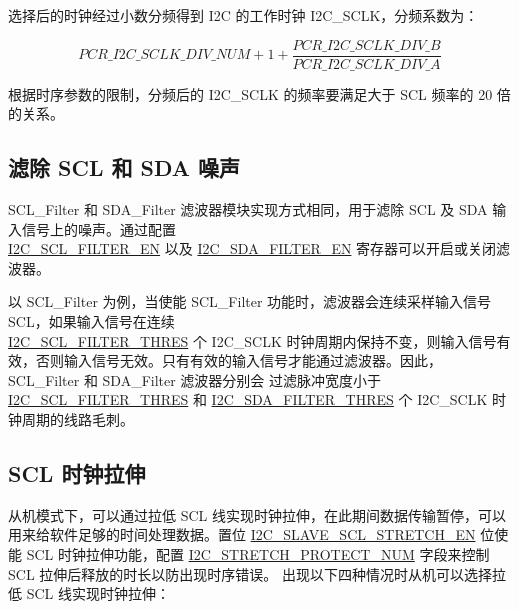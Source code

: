 \documentclass[main\_\_CN.tex]{subfiles}
\begin{document}
选择后的时钟经过小数分频得到 I2C 的工作时钟 I2C\_SCLK，分频系数为：

\[
PCR\_I2C\_SCLK\_DIV\_ NUM + 1+\frac{ \hyperref[fielddesc:PCRI2CSCLKDIVB]{PCR\_I2C\_SCLK\_DIV\_B}}{\hyperref[fielddesc:PCRI2CSCLKDIVA]{PCR\_I2C\_SCLK\_DIV\_A}}
\]

根据时序参数的限制，分频后的 I2C\_SCLK 的频率要满足大于 SCL 频率的 20 倍的关系。


\subsection{滤除 SCL 和 SDA 噪声}
SCL\_Filter 和 SDA\_Filter 滤波器模块实现方式相同，用于滤除 SCL 及 SDA 输入信号上的噪声。通过配置\\\hyperref[fielddesc:I2CSCLFILTEREN]{I2C\_SCL\_FILTER\_EN} 以及 \hyperref[fielddesc:I2CSDAFILTEREN]{I2C\_SDA\_FILTER\_EN} 寄存器可以开启或关闭滤波器。

以 SCL\_Filter 为例，当使能 SCL\_Filter 功能时，滤波器会连续采样输入信号 SCL，如果输入信号在连续 \\\hyperref[fielddesc:I2CSCLFILTERTHRES]{I2C\_SCL\_FILTER\_THRES} 个 I2C\_SCLK 时钟周期内保持不变，则输入信号有效，否则输入信号无效。只有有效的输入信号才能通过滤波器。因此，SCL\_Filter 和 SDA\_Filter 滤波器分别会
过滤脉冲宽度小于 \hyperref[fielddesc:I2CSCLFILTERTHRES]{I2C\_SCL\_FILTER\_THRES} 和 \hyperref[fielddesc:I2CSDAFILTERTHRES]{I2C\_SDA\_FILTER\_THRES} 个 I2C\_SCLK 时钟周期的线路毛刺。

\subsection{SCL 时钟拉伸}
从机模式下，可以通过拉低 SCL 线实现时钟拉伸，在此期间数据传输暂停，可以用来给软件足够的时间处理数据。置位 \hyperref[fielddesc:I2CSLAVESCLSTRETCHEN]{I2C\_SLAVE\_SCL\_STRETCH\_EN} 位使能 SCL 时钟拉伸功能，配置 \hyperref[fielddesc:I2CSTRETCHPROTECTNUM]{I2C\_STRETCH\_PROTECT\_NUM} 字段来控制 SCL 拉伸后释放的时长以防出现时序错误。
出现以下四种情况时从机可以选择拉低 SCL 线实现时钟拉伸：
\end{document}
